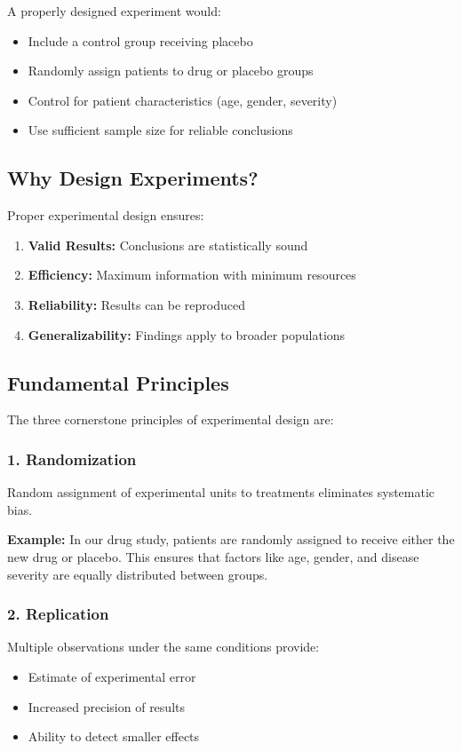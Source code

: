 \documentclass[twoside]{book}
\begin{document}
A properly designed experiment would:
\begin{itemize}
    \item Include a control group receiving placebo
    \item Randomly assign patients to drug or placebo groups
    \item Control for patient characteristics (age, gender, severity)
    \item Use sufficient sample size for reliable conclusions
\end{itemize}

\subsection{Why Design Experiments?}

Proper experimental design ensures:
\begin{enumerate}
    \item \textbf{Valid Results:} Conclusions are statistically sound
    \item \textbf{Efficiency:} Maximum information with minimum resources
    \item \textbf{Reliability:} Results can be reproduced
    \item \textbf{Generalizability:} Findings apply to broader populations
\end{enumerate}

\subsection{Fundamental Principles}

The three cornerstone principles of experimental design are:

\subsubsection{1. Randomization}
Random assignment of experimental units to treatments eliminates systematic bias.

\textbf{Example:} In our drug study, patients are randomly assigned to receive either the new drug or placebo. This ensures that factors like age, gender, and disease severity are equally distributed between groups.

\subsubsection{2. Replication}
Multiple observations under the same conditions provide:
\begin{itemize}
    \item Estimate of experimental error
    \item Increased precision of results
    \item Ability to detect smaller effects
\end{itemize}
\end{document}
